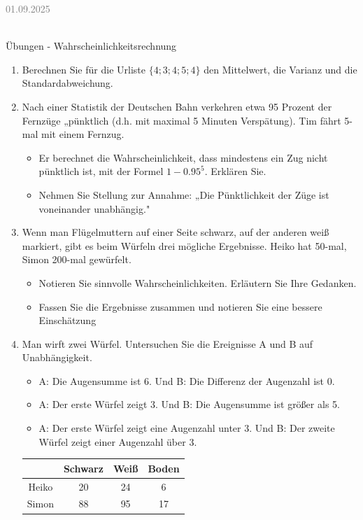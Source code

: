 \documentclass[11pt,a4paper,oneside]{article}
\newcommand{\lessondate}[1]{
	\noindent\hfill\textcolor{gray}{\textsc{#1}} \\
	\vspace{0.5cm}
}
\begin{document}
	
	\newpage
	
	\lessondate{01.09.2025}\\
	
	\begin{aufgabe}{Übungen - Wahrscheinlichkeitsrechnung}
		\begin{enumerate}
			\item Berechnen Sie für die Urliste $\{4;3; 4; 5; 4 \}$ den Mittelwert, die Varianz und die Standardabweichung.
			\item Nach einer Statistik der Deutschen Bahn verkehren etwa 95 Prozent der Fernzüge „pünktlich (d.h. mit maximal 5 Minuten Verspätung). Tim fährt 5-mal mit einem Fernzug.
			\begin{itemize}
				\item Er berechnet die Wahrscheinlichkeit, dass mindestens ein Zug nicht pünktlich ist, mit der Formel $1 - 0.95^5$. Erklären Sie.
				\item Nehmen Sie Stellung zur Annahme: „Die Pünktlichkeit der Züge ist voneinander unabhängig."
			\end{itemize} 
		\item Wenn man Flügelmuttern auf einer Seite schwarz, auf der anderen weiß markiert, gibt es beim Würfeln drei mögliche Ergebnisse. Heiko hat 50-mal, Simon 200-mal gewürfelt.
		\begin{itemize}
			\item Notieren Sie sinnvolle Wahrscheinlichkeiten. Erläutern Sie Ihre Gedanken.
			\item Fassen Sie die Ergebnisse zusammen und notieren Sie eine bessere Einschätzung 
		\end{itemize}
		\item Man wirft zwei Würfel. Untersuchen Sie die Ereignisse A und B auf Unabhängigkeit. 
		\begin{itemize}
			\item A: Die Augensumme ist 6. Und B: Die Differenz der Augenzahl ist 0.
			\item A: Der erste Würfel zeigt 3. Und B: Die Augensumme ist größer als 5.
			\item A: Der erste Würfel zeigt eine Augenzahl unter 3. Und B: Der zweite Würfel zeigt einer Augenzahl über 3. 
		\end{itemize}
		\begin{center}
			\begin{tabular}{|c|c|c|c|}
				\hline 
				\diagbox{Namen}{Ergebnisse} & Schwarz & Weiß & Boden\\ \hline 
				Heiko & 20 & 24 & 6 \\ \hline
				Simon & 88 & 95 & 17 \\ \hline 
			\end{tabular}
		\end{center}
		\end{enumerate}
	\end{aufgabe}
	
\end{document}
